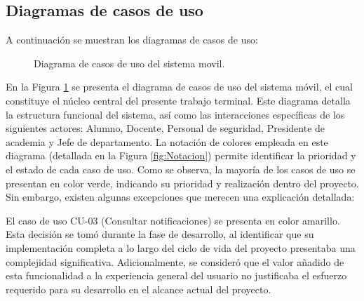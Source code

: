 \newpage

\subsection{Diagramas de casos de uso}

A continuación se muestran los diagramas de casos de uso:


\begin{figure}[htbp!]
	\begin{center}
		\caption{Diagrama de casos de uso del sistema movil.}
		\label{fig:casosDeUso1}
	\end{center}
\end{figure}

En la Figura \ref{fig:casosDeUso1} se presenta el diagrama de casos de uso del sistema móvil, el cual constituye el núcleo central del presente trabajo terminal. Este diagrama detalla la estructura funcional del sistema, así como las interacciones específicas de los siguientes actores: Alumno, Docente, Personal de seguridad, Presidente de academia y Jefe de departamento. La notación de colores empleada en este diagrama (detallada en la Figura \ref{fig:Notacion}) permite identificar la prioridad y el estado de cada caso de uso.
Como se observa, la mayoría de los casos de uso se presentan en color verde, indicando su prioridad y realización dentro del proyecto. Sin embargo, existen algunas excepciones que merecen una explicación detallada:


El caso de uso CU-03 (Consultar notificaciones) se presenta en color amarillo. Esta decisión se tomó durante la fase de desarrollo, al identificar que su implementación completa a lo largo del ciclo de vida del proyecto presentaba una complejidad significativa. Adicionalmente, se consideró que el valor añadido de esta funcionalidad a la experiencia general del usuario no justificaba el esfuerzo requerido para su desarrollo en el alcance actual del proyecto.


